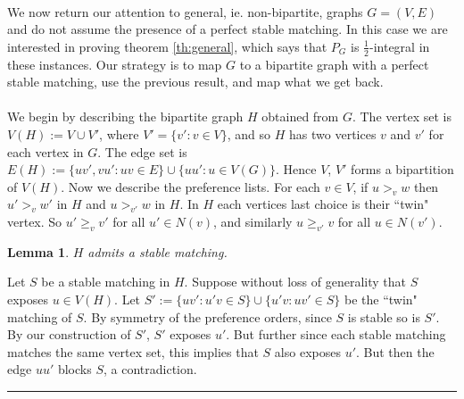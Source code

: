 \documentclass[letterpaper,12pt,oneside,onecolumn]{article}
\newenvironment{proof}{{\bf Proof:  }}{\hfill\rule{2mm}{2mm}}
\newtheorem{lemma}[fact]{Lemma}
\begin{document}
\paragraph{}
We now return our attention to general, ie. non-bipartite, graphs $G = (V,E)$ and do not assume the presence of a perfect stable matching. In this case we are interested in proving theorem \ref{th:general}, which says that $P_G$ is $\frac{1}{2}$-integral in these instances. Our strategy is to map $G$ to a bipartite graph with a perfect stable matching, use the previous result, and map what we get back.
\paragraph{}
We begin by describing the bipartite graph $H$ obtained from $G$. The vertex set is $V(H) := V \cup V'$, where $V' = \{v' : v \in V\}$, and so $H$ has two vertices $v$ and $v'$ for each vertex in $G$. The edge set is $E(H) := \{uv', vu': uv \in E\} \cup \{uu' : u \in V(G)\}$. Hence $V$, $V'$ forms a bipartition of $V(H)$. Now we describe the preference lists. For each $v \in V$, if $u >_v w$ then $u'>_v w'$ in $H$ and $u >_{v'} w$ in $H$. In $H$ each vertices last choice is their ``twin" vertex. So $u' \geq_v v'$ for all $u' \in N(v)$, and similarly $u \geq_{v'} v$ for all $u \in N(v')$.
\begin{lemma}
$H$ admits a stable matching.
\end{lemma}
\begin{proof}
Let $S$ be a stable matching in $H$. Suppose without loss of generality that $S$ exposes $u \in V(H)$. Let $S' := \{uv' :u'v \in S\} \cup \{u'v: uv' \in S\}$ be the ``twin" matching of $S$. By symmetry of the preference orders, since $S$ is stable so is $S'$. By our construction of $S'$, $S'$ exposes $u'$. But further since each stable matching matches the same vertex set, this implies that $S$ also exposes $u'$. But then the edge $uu'$ blocks $S$, a contradiction.
\end{proof}
\end{document}
